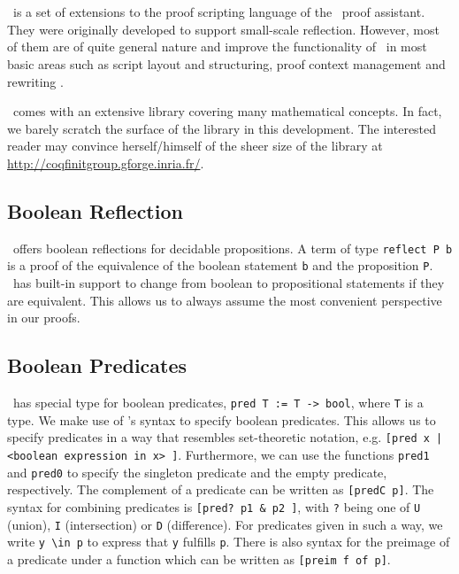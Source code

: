 \section{\ssreflect}


\ssreflect\ is a set of extensions to the proof scripting language of the \coq\ proof assistant. 
They were originally developed to support small-scale reflection. 
However, most of them are of quite general nature and improve the functionality of \coq\ in most basic areas such as script layout and structuring, proof context management and rewriting \cite{gonthier:inria-00258384}.

\ssreflect\ comes with an extensive library covering many mathematical concepts. 
In fact, we barely scratch the surface of the library in this development. 
The interested reader may convince herself/himself of the sheer size of the library at \url{http://coqfinitgroup.gforge.inria.fr/}.

\subsection{Boolean Reflection}
\ssreflect\ offers boolean reflections for decidable propositions. 
A term of type \lstinline{reflect P b} is a proof of the equivalence of the boolean statement \lstinline{b} and the proposition \lstinline{P}.
\ssreflect\ has built-in support to change from boolean to propositional statements if they are equivalent. 
This allows us to always assume the most convenient perspective in our proofs.


\subsection{Boolean Predicates}
\ssreflect\ has special type for boolean predicates, \lstinline{pred T := T -> bool}, where \lstinline{T} is a type.
We make use of \ssreflect's syntax to specify boolean predicates.
This allows us to specify predicates in a way that resembles set-theoretic notation, e.g. 
\lstinline{[pred x | <boolean expression in x> ]}.
Furthermore, we can use the functions \lstinline{pred1} and \lstinline{pred0} to specify the singleton predicate and the empty predicate, respectively.
The complement of a predicate can be written as \lstinline{[predC p]}. 
The syntax for combining predicates is \lstinline{[pred? p1 & p2 ]}, with \lstinline{?} being one of 
\lstinline{U} (union), \lstinline{I} (intersection) or \lstinline{D} (difference).
For predicates given in such a way, we write \lstinline{y \in p} to express that \lstinline{y} fulfills \lstinline{p}.
There is also syntax for the preimage of a predicate under a function
which can be written as \lstinline{[preim f of p]}.

